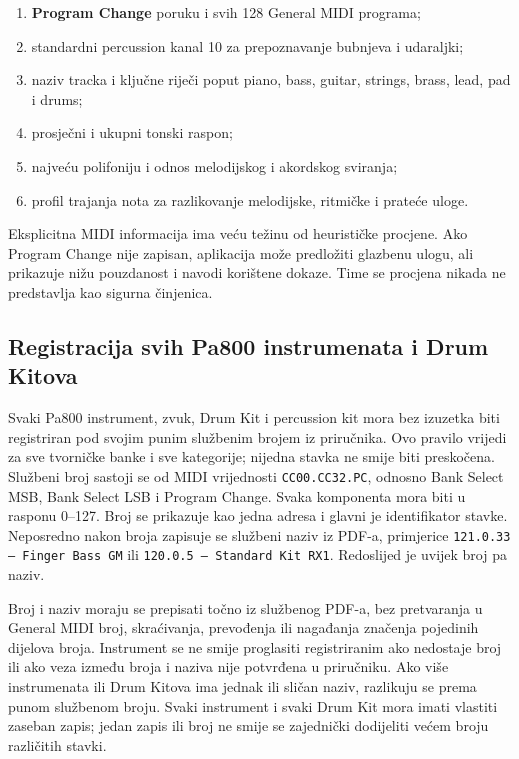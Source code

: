 \documentclass[11pt]{article}
\begin{document}
\begin{enumerate}
    \item \textbf{Program Change} poruku i svih 128 General MIDI programa;
    \item standardni percussion kanal 10 za prepoznavanje bubnjeva i udaraljki;
    \item naziv tracka i ključne riječi poput piano, bass, guitar, strings,
    brass, lead, pad i drums;
    \item prosječni i ukupni tonski raspon;
    \item najveću polifoniju i odnos melodijskog i akordskog sviranja;
    \item profil trajanja nota za razlikovanje melodijske, ritmičke i prateće
    uloge.
\end{enumerate}

Eksplicitna MIDI informacija ima veću težinu od heurističke procjene. Ako
Program Change nije zapisan, aplikacija može predložiti glazbenu ulogu, ali
prikazuje nižu pouzdanost i navodi korištene dokaze. Time se procjena nikada ne
predstavlja kao sigurna činjenica.

\subsection{Registracija svih Pa800 instrumenata i Drum Kitova}

Svaki Pa800 instrument, zvuk, Drum Kit i percussion kit mora bez izuzetka biti
registriran pod svojim punim službenim brojem iz priručnika. Ovo pravilo vrijedi
za sve tvorničke banke i sve kategorije; nijedna stavka ne smije biti
preskočena. Službeni broj sastoji se od MIDI vrijednosti \texttt{CC00.CC32.PC},
odnosno Bank Select MSB, Bank Select LSB i Program Change. Svaka komponenta mora
biti u rasponu 0--127. Broj se prikazuje kao jedna adresa i glavni je
identifikator stavke. Neposredno nakon broja zapisuje se službeni naziv iz
PDF-a, primjerice \texttt{121.0.33 --- Finger Bass GM} ili
\texttt{120.0.5 --- Standard Kit RX1}. Redoslijed je uvijek broj pa naziv.

Broj i naziv moraju se prepisati točno iz službenog PDF-a, bez pretvaranja u
General MIDI broj, skraćivanja, prevođenja ili nagađanja značenja pojedinih
dijelova broja. Instrument se ne smije proglasiti registriranim ako nedostaje
broj ili ako veza između broja i naziva nije potvrđena u priručniku. Ako više
instrumenata ili Drum Kitova ima jednak ili sličan naziv, razlikuju se prema
punom službenom broju. Svaki instrument i svaki Drum Kit mora imati vlastiti
zaseban zapis; jedan zapis ili broj ne smije se zajednički dodijeliti većem broju
različitih stavki.
\end{document}
